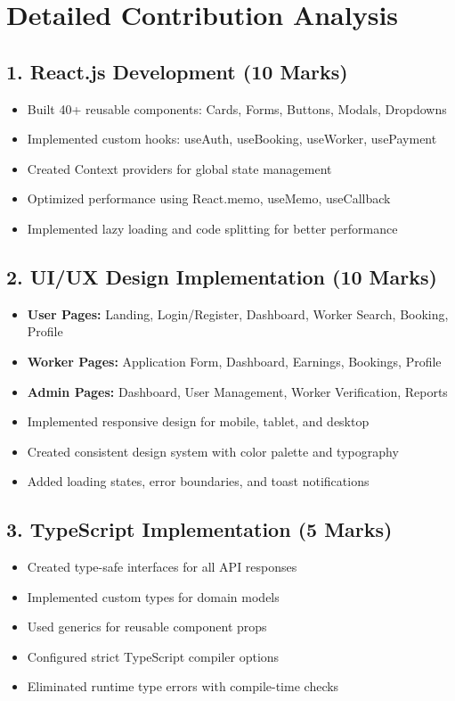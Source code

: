 \documentclass[12pt,a4paper]{article}
\begin{document}
\newpage

\section*{Detailed Contribution Analysis}

\subsection*{1. React.js Development (10 Marks)}
\begin{itemize}[leftmargin=*]
    \item Built 40+ reusable components: Cards, Forms, Buttons, Modals, Dropdowns
    \item Implemented custom hooks: useAuth, useBooking, useWorker, usePayment
    \item Created Context providers for global state management
    \item Optimized performance using React.memo, useMemo, useCallback
    \item Implemented lazy loading and code splitting for better performance
\end{itemize}

\subsection*{2. UI/UX Design Implementation (10 Marks)}
\begin{itemize}[leftmargin=*]
    \item \textbf{User Pages:} Landing, Login/Register, Dashboard, Worker Search, Booking, Profile
    \item \textbf{Worker Pages:} Application Form, Dashboard, Earnings, Bookings, Profile
    \item \textbf{Admin Pages:} Dashboard, User Management, Worker Verification, Reports
    \item Implemented responsive design for mobile, tablet, and desktop
    \item Created consistent design system with color palette and typography
    \item Added loading states, error boundaries, and toast notifications
\end{itemize}

\subsection*{3. TypeScript Implementation (5 Marks)}
\begin{itemize}[leftmargin=*]
    \item Created type-safe interfaces for all API responses
    \item Implemented custom types for domain models
    \item Used generics for reusable component props
    \item Configured strict TypeScript compiler options
    \item Eliminated runtime type errors with compile-time checks
\end{itemize}
\end{document}
